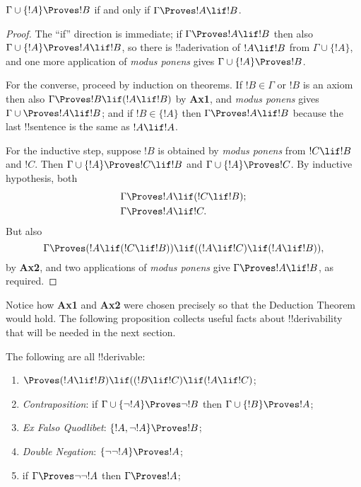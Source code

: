 \documentclass[../../../include/open-logic-section]{subfiles}
\begin{document}
\begin{thm}
$\Gamma \cup \{!A\} \Proves !B$ if and only if $\Gamma \Proves !A \lif
!B$.
\end{thm}

\begin{proof}
The ``if'' direction is immediate; if $\Gamma \Proves !A \lif !B$ then
also $\Gamma \cup \{!A\}\Proves !A \lif !B$, so there is
!!a{derivation} of $!A\lif !B$ from $\Gamma \cup \{!A\}$, and one more
application of \emph{modus ponens} gives $\Gamma \cup \{!A\} \Proves
!B$.

For the converse, proceed by induction on theorems. If $!B \in \Gamma$
or $!B$ is an axiom then also $\Gamma \Proves !B \lif (!A \lif !B)$ by
\textbf{Ax1}, and \emph{modus ponens} gives $\Gamma\cup \Proves !A
\lif !B$; and if $!B \in \{ !A\}$ then $\Gamma \Proves !A \lif !B$
because the last !!{sentence} is the same as $!A \lif !A$.

For the inductive step, suppose $!B$ is obtained by \emph{modus
  ponens} from $!C \lif !B$ and $!C$. Then $\Gamma \cup \{ !A\}
\Proves !C \lif !B$ and $\Gamma \cup \{ !A\} \Proves !C$. By inductive
hypothesis, both
\begin{align*}
  & \Gamma \Proves !A \lif (!C \lif !B); \\
  & \Gamma \Proves !A \lif !C.
\end{align*}
But also
\[
\Gamma \Proves (!A \lif (!C \lif !B)) \lif
((!A\lif !C)  \lif (!A \lif !B)),
\]
by \textbf{Ax2}, and two applications of \emph{modus ponens} give
$\Gamma \Proves !A \lif !B$, as required.
\end{proof}

Notice how \textbf{Ax1} and \textbf{Ax2} were chosen precisely so that
the Deduction Theorem would hold. The following proposition collects
useful facts about !!{derivability} that will be needed in the next
section.

\begin{prop}
The following are all !!{derivable}:
\begin{enumerate}
\item $\Proves (!A \lif !B) \lif ((!B \lif !C)
  \lif (!A \lif !C)$; 
\item \emph{Contraposition}: if $\Gamma \cup \{ \lnot !A\}
  \Proves \lnot !B$ then $\Gamma \cup \{ !B\} \Proves
  !A$; 
\item \emph{Ex Falso Quodlibet}: $\{ !A, \lnot!A\} \Proves
    !B$; 
\item \emph{Double Negation}: $\{ \lnot\lnot!A\} \Proves
  !A$;
\item if $\Gamma \Proves \lnot\lnot!A$ then $\Gamma \Proves
  !A$;
\end{enumerate}
\end{prop}
\end{document}
